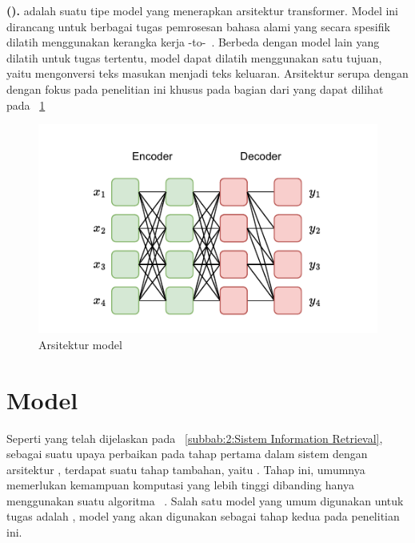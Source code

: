 \vspace{2mm}
\noindent\textbf{\ttttt{} (\tfive{}).}
\ttttt{} adalah suatu tipe model yang menerapkan arsitektur transformer. Model ini dirancang untuk berbagai tugas pemrosesan bahasa alami yang secara spesifik dilatih menggunakan kerangka kerja \txt{}-to-\txt{}~\citep{raffel2020exploring}. Berbeda dengan model lain yang dilatih untuk tugas tertentu, model \tfive{} dapat dilatih menggunakan satu tujuan, yaitu mengonversi teks masukan menjadi teks keluaran. Arsitektur \tfive{} serupa dengan \bert{} dengan fokus pada penelitian ini khusus pada bagian \encoder{} dari \tfive{} yang dapat dilihat pada \gambar{}~\ref{fig:ilustrasi t5}
\begin{figure}[!ht]
    \centering
    \includegraphics[scale=1.5]{assets/pdfs/t5 structure.drawio.pdf}
    \caption{Arsitektur model \tfive{}}
    \label{fig:ilustrasi t5}
\end{figure}





\section{Model \Reranker{}}
\label{subbab:2:Model Reranker}
Seperti yang telah dijelaskan pada \bab~\ref{subbab:2:Sistem Information Retrieval}, sebagai suatu upaya perbaikan pada tahap \ranking{} pertama dalam sistem \ir{} dengan arsitektur \cascaded{}, terdapat suatu tahap tambahan, yaitu \reranking{}. Tahap \reranking{} ini, umumnya memerlukan kemampuan komputasi yang lebih tinggi dibanding hanya menggunakan suatu algoritma \txt{} \matching{}~\citep{zhan2020learning}. Salah satu model \reranker{} yang umum digunakan untuk tugas \ranking{} adalah \lambdamart{}, model yang akan digunakan sebagai tahap \ranking{} kedua pada penelitian ini.

